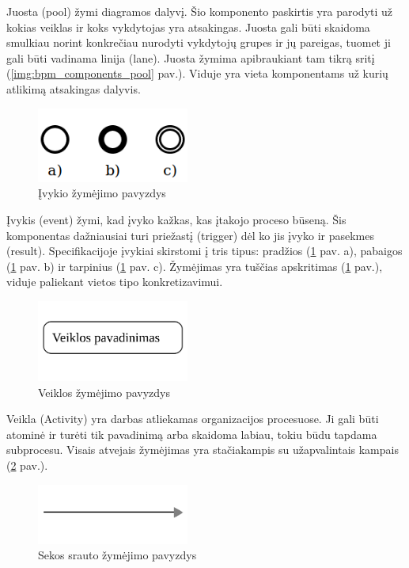 Juosta (pool) žymi diagramos dalyvį. Šio komponento paskirtis yra parodyti už kokias veiklas ir koks vykdytojas yra atsakingas. Juosta gali būti skaidoma smulkiau norint konkrečiau nurodyti vykdytojų grupes ir jų pareigas, tuomet ji gali būti vadinama linija (lane). Juosta žymima apibraukiant tam tikrą sritį (\ref{img:bpm_components_pool} pav.). Viduje yra vieta komponentams už kurių atlikimą atsakingas dalyvis.

\begin{figure}[H]
	\centering
	\includegraphics[width=5cm]{img/bpm-components/event_types}
	\caption{Įvykio žymėjimo pavyzdys}
	\label{img:bpm_event_types}
\end{figure}

Įvykis (event) žymi, kad įvyko kažkas, kas įtakojo proceso būseną. Šis komponentas dažniausiai turi priežastį (trigger) dėl ko jis įvyko ir pasekmes (result). Specifikacijoje įvykiai skirstomi į tris tipus: pradžios (\ref{img:bpm_event_types} pav. a), pabaigos (\ref{img:bpm_event_types} pav. b) ir tarpinius (\ref{img:bpm_event_types} pav. c). Žymėjimas yra tuščias apskritimas (\ref{img:bpm_event_types} pav.), viduje paliekant vietos tipo konkretizavimui.

\begin{figure}[H]
	\centering
	\includegraphics[width=5cm]{img/bpm-components/activity}
	\caption{Veiklos žymėjimo pavyzdys}
	\label{img:bpm_components_activity}
\end{figure}

Veikla (Activity) yra darbas atliekamas organizacijos procesuose. Ji gali būti atominė ir turėti tik pavadinimą arba  skaidoma labiau, tokiu būdu tapdama subprocesu. Visais atvejais žymėjimas yra stačiakampis su užapvalintais kampais (\ref{img:bpm_components_activity} pav.).

\begin{figure}[H]
	\centering
	\includegraphics[width=5cm]{img/bpm-components/transition}
	\caption{Sekos srauto žymėjimo pavyzdys}
	\label{img:bpm_components_sequence_flow}
\end{figure}

